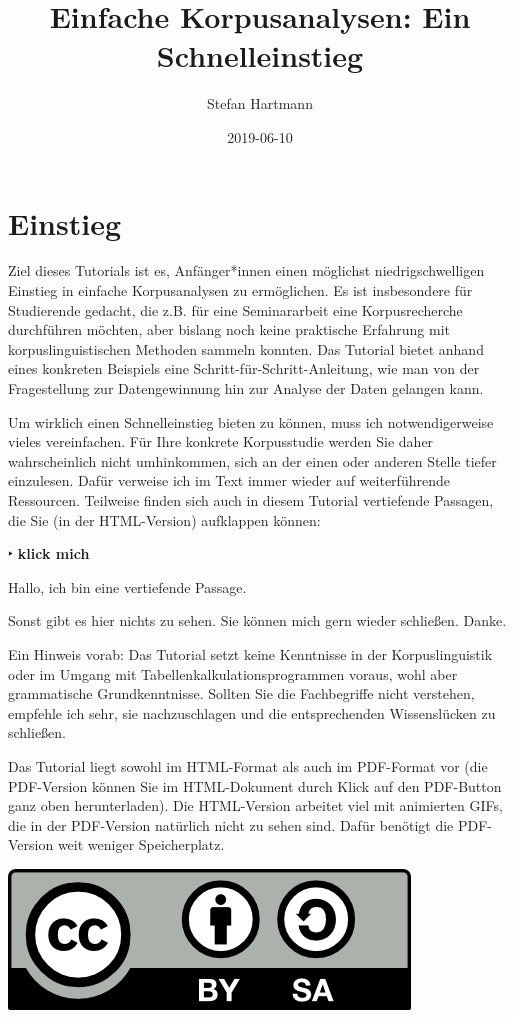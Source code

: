 \documentclass[]{article}
\title{Einfache Korpusanalysen: Ein Schnelleinstieg}
\author{Stefan Hartmann}
\date{2019-06-10}
\begin{document}
\maketitle

{
\setcounter{tocdepth}{4}
\tableofcontents
}
\section{Einstieg}\label{einstieg}

Ziel dieses Tutorials ist es, Anfänger*innen einen möglichst
niedrigschwelligen Einstieg in einfache Korpusanalysen zu ermöglichen.
Es ist insbesondere für Studierende gedacht, die z.B. für eine
Seminararbeit eine Korpusrecherche durchführen möchten, aber bislang
noch keine praktische Erfahrung mit korpuslinguistischen Methoden
sammeln konnten. Das Tutorial bietet anhand eines konkreten Beispiels
eine Schritt-für-Schritt-Anleitung, wie man von der Fragestellung zur
Datengewinnung hin zur Analyse der Daten gelangen kann.

Um wirklich einen Schnelleinstieg bieten zu können, muss ich
notwendigerweise vieles vereinfachen. Für Ihre konkrete Korpusstudie
werden Sie daher wahrscheinlich nicht umhinkommen, sich an der einen
oder anderen Stelle tiefer einzulesen. Dafür verweise ich im Text immer
wieder auf weiterführende Ressourcen. Teilweise finden sich auch in
diesem Tutorial vertiefende Passagen, die Sie (in der HTML-Version)
aufklappen können:

 ‣ \textbf{klick mich}

Hallo, ich bin eine vertiefende Passage.

Sonst gibt es hier nichts zu sehen. Sie können mich gern wieder
schließen. Danke.

Ein Hinweis vorab: Das Tutorial setzt keine Kenntnisse in der
Korpuslinguistik oder im Umgang mit Tabellenkalkulationsprogrammen
voraus, wohl aber grammatische Grundkenntnisse. Sollten Sie die
Fachbegriffe nicht verstehen, empfehle ich sehr, sie nachzuschlagen und
die entsprechenden Wissenslücken zu schließen.

Das Tutorial liegt sowohl im HTML-Format als auch im PDF-Format vor (die
PDF-Version können Sie im HTML-Dokument durch Klick auf den PDF-Button
ganz oben herunterladen). Die HTML-Version arbeitet viel mit animierten
GIFs, die in der PDF-Version natürlich nicht zu sehen sind. Dafür
benötigt die PDF-Version weit weniger Speicherplatz.

\begin{center}\includegraphics[width=0.3\linewidth,height=0.3\textheight]{fig/by-sa} \end{center}
\end{document}
